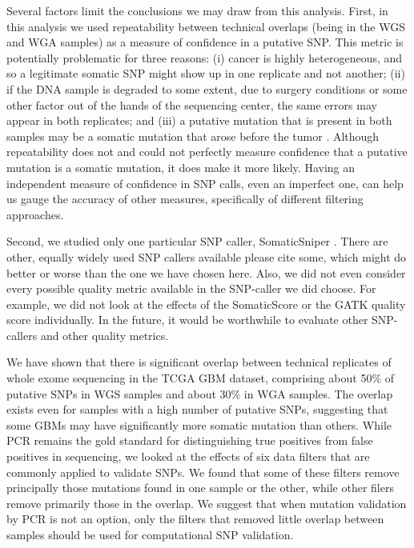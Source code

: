 \documentclass[11pt]{article} %
\begin{document}
{Several factors limit the conclusions we may draw from this analysis. First, in this analysis we used repeatability between technical overlaps (being in the WGS and WGA samples) as a measure of confidence in a putative SNP. This metric is potentially problematic for three reasons: (i) cancer is highly heterogeneous, and so a legitimate somatic SNP might show up in one replicate and not another; (ii) if the DNA sample is degraded to some extent, due to surgery conditions or some other factor out of the hands of the sequencing center, the same errors may appear in both replicates; and (iii) a putative mutation that is present in both samples may be a somatic mutation that arose before the tumor \citep{pre-tumor-muts}. Although repeatability does not and could not perfectly measure confidence that a putative mutation is a somatic mutation, it does make it more likely. Having an independent measure of confidence in SNP calls, even an imperfect one, can help us gauge the accuracy of other measures, specifically of different filtering approaches. 

Second, we studied only one particular SNP caller, SomaticSniper \citep{SomaticSniper}. There are other, equally widely used SNP callers available {\color{red}please cite some}, which might do better or worse than the one we have chosen here. Also, we did not even consider every possible quality metric available in the SNP-caller we did choose. For example, we did not look at the effects of the SomaticScore or the GATK quality score individually. In the future, it would be worthwhile to evaluate other SNP-callers and other quality metrics.

We have shown that there is significant overlap between technical replicates of whole exome sequencing in the TCGA GBM dataset, comprising about 50\% of putative SNPs in WGS samples and about 30\% in WGA samples. The overlap exists even for samples with a high number of putative SNPs, suggesting that some GBMs may have significantly more somatic mutation than others. While PCR remains the gold standard for distinguishing true positives from false positives in sequencing, we looked at the effects of six data filters that are commonly applied to validate SNPs. We found that some of these filters remove principally those mutations found in one sample or the other, while other filers remove primarily those in the overlap. We suggest that when mutation validation by PCR is not an option, only the filters that removed little overlap between samples should be used for computational SNP validation.

}
\end{document}
